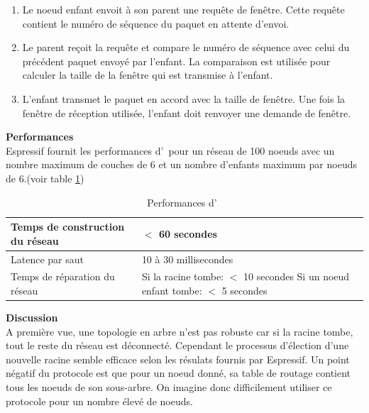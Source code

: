             \begin{enumerate}
                \item Le noeud enfant envoit à son parent une requête de fenêtre. Cette requête contient le numéro de séquence du paquet en attente d'envoi.
                \item Le parent reçoit la requête et compare le numéro de séquence avec celui du précédent paquet envoyé par l'enfant.
                    La comparaison est utilisée pour calculer la taille de la fenêtre qui est transmise à l'enfant.
                \item L'enfant transmet le paquet en accord avec la taille de fenêtre. Une fois la fenêtre de réception utilisée, l'enfant doit renvoyer une demande de fenêtre.
            \end{enumerate}
        \vspace{0.5cm}
        \textbf{Performances}\\
            Espressif fournit les performances d'\espmesh\ pour un réseau de 100 noeuds avec un nombre maximum de couches de 6 
            et un nombre d'enfants maximum par noeuds de 6.(voir table \ref{performances_espMesh})
            \begin{table}[H]
                \begin{tabular}{|l|l|}
                    \hline
                    Temps de construction du réseau & $<$ 60 secondes\\ \hline
                    Latence par saut & 10 à 30 millisecondes\\ \hline
                    Temps de réparation du réseau & \makecell{Si la racine tombe: $<$ 10 secondes \\ Si un noeud enfant tombe: $<$ 5 secondes}\\ \hline
                \end{tabular}
                \caption{Performances d'\espmesh\ \cite{esp-mesh_w}}
                \label{performances_espMesh}
            \end{table}

            
        \textbf{Discussion}\\
            A première vue, une topologie en arbre n'est pas robuste car si la racine tombe,
            tout le reste du réseau est déconnecté. Cependant le processus d'élection
            d'une nouvelle racine semble efficace selon les résulats fournis par Espressif.
            Un point négatif du protocole est que pour un noeud donné, sa table de routage contient tous les
            noeuds de son sous-arbre.
            On imagine donc difficilement utiliser ce protocole pour un nombre élevé de noeuds.